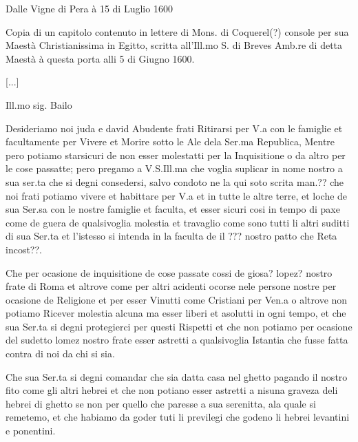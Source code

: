 \stopcifrato

Dalle Vigne di Pera à 15 di Luglio 1600



Copia  di un  capitolo contenuto  in lettere  di Mons.  di Coquerel(?)
console per  sua Maestà Christianissima in  Egitto, scritta all'Ill.mo
S. di  Breves Amb.re di detta Maestà  à questa porta alli  5 di Giugno
1600.

[...]


\begin{center}
Ill.mo sig. Bailo
\end{center}

Desideriamo noi juda  e david Abudente frati Ritirarsi  per V.a con le
famiglie et facultamente per Vivere et Morire sotto le Ale dela Ser.ma
Republica, Mentre pero potiamo  starsicuri de non esser molestatti per
la  Inquisitione o  da  altro per  le  cose passatte;  pero pregamo  a
V.S.Ill.ma  che voglia suplicar  in nome  nostro a  sua ser.ta  che si
degni consedersi, salvo  condoto ne la qui soto  scrita man.?? che noi
frati potiamo vivere et habittare per  V.a et in tutte le altre terre,
et loche  de sua Ser.sa  con le nostre  famiglie et faculta,  et esser
sicuri cosi in tempo di paxe come de guera de qualsivoglia molestia et
travaglio come sono tutti li  altri suditti di sua Ser.ta et l'istesso
si intenda in la faculta de il ??? nostro patto che Reta incost??.

Che  per ocasione  de inquisitione  de  cose passate  cossi de  giosa?
lopez? nostro frate di Roma  et altrove come per altri acidenti ocorse
nele persone  nostre per  ocasione de Religione  et per  esser Vinutti
come Cristiani per Ven.a o altrove non potiamo Ricever molestia alcuna
ma esser liberi et asolutti in  ogni tempo, et che sua Ser.ta si degni
protegierci per  questi Rispetti et  che non potiamo per  ocasione del
sudetto lomez nostro frate  esser astretti a qualsivoglia Istantia che
fusse fatta contra di noi da chi si sia.

Che sua Ser.ta si degni comandar che sia datta casa nel ghetto pagando
il nostro fito come gli altri hebrei et che non potiano esser astretti
a nisuna graveza deli hebrei di ghetto se non per quello che paresse a
sua serenitta, ala quale si remetemo,  et che habiamo da goder tuti li
previlegi che godeno li hebrei levantini e ponentini.

